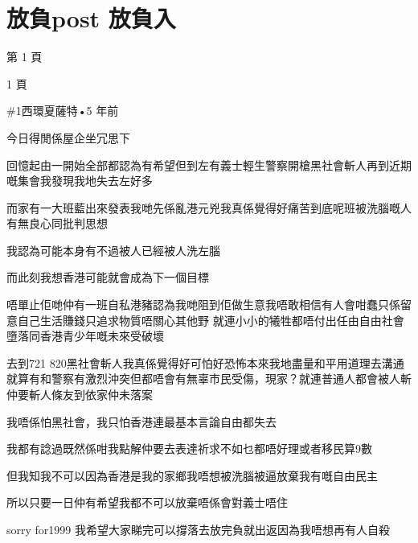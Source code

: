 \chapter{放負post 放負入}

第 1 頁

1 頁

\#1西環夏薩特•5 年前

今日得閒係屋企坐冗思下

回憶起由一開始全部都認為有希望但到左有義士輕生警察開槍黑社會斬人再到近期嘅集會我發現我地失去左好多

而家有一大班藍出來發表我哋先係亂港元兇我真係覺得好痛苦到底呢班被洗腦嘅人有無良心同批判思想

我認為可能本身有不過被人已經被人洗左腦

而此刻我想香港可能就會成為下一個目標

唔單止佢哋仲有一班自私港豬認為我哋阻到佢做生意我唔敢相信有人會咁蠢只係留意自己生活賺錢只追求物質唔關心其他野 就連小小的犧牲都唔付出任由自由社會墮落同香港青少年嘅未來受破壞

去到721 820黑社會斬人我真係覺得好可怕好恐怖本來我地盡量和平用道理去溝通就算有和警察有激烈沖突但都唔會有無辜巿民受傷，現家？就連普通人都會被人斬仲要斬人條友到依家仲未落案

我唔係怕黑社會，我只怕香港連最基本言論自由都失去

我都有諗過既然係咁我點解仲要去表達祈求不如乜都唔好理或者移民算9數

但我知我不可以因為香港是我的家鄉我唔想被洗腦被逼放棄我有嘅自由民主

所以只要一日仲有希望我都不可以放棄唔係會對義士唔住

sorry for1999 我希望大家睇完可以撐落去放完負就出返因為我唔想再有人自殺

